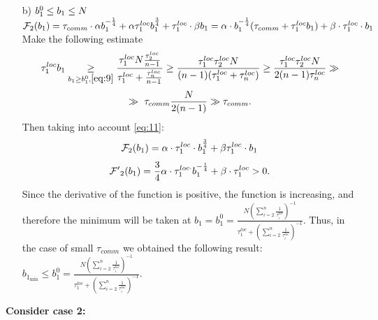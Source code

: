 \documentclass{article}
\begin{document}
\begin{itemize}
    \item[b)] $b_1^0\leq b_1\leq N\\$
    $\mathcal{F}_2(b_1) = \tau_{comm}\cdot 
    \alpha  b_1^{-\frac{1}{4}} + 
    \alpha\tau_1^{loc} b_1^{\frac{3}{4}}  + \tau_1^{loc}\cdot \beta b_1 =  \alpha\cdot b_1^{-\frac{1}{4}}(\tau_{comm} + \tau_1^{loc}b_1) + \beta\cdot\tau_1^{loc}\cdot b_1\\$
    Make the following estimate
    \begin{equation}
    \label{eq:11}
      \tau_1^{loc}b_1\underset{b_1\geq b_1^0, \eqref{eq:9}}{\geq} \frac{\tau_1^{loc}N\frac{\tau_2^{loc}}{n - 1}}{\tau_1^{loc} + \frac{\tau_n^{loc}}{n - 1}}\geq \frac{\tau_1^{loc}\tau_2^{loc}N}{(n - 1)(\tau_1^{loc} + \tau_n^{loc})}\geq \frac{\tau_1^{loc}\tau_2^{loc}N}{2(n - 1)\tau_n^{loc}} \gg
    \end{equation}
    \begin{equation}
         \notag
         \gg ~
       \tau_{comm}\frac{N}{2(n - 1)} \gg \tau_{comm}.
    \end{equation}
    Then taking into account \eqref{eq:11}:
    \begin{equation}
        \notag
        \mathcal F_2(b_1) = \alpha\cdot\tau_1^{loc}\cdot b_1^{\frac{3}{4}} + \beta \tau_1^{loc}\cdot b_1
    \end{equation}
    \begin{equation}
        \notag
        \mathcal{F'}_2(b_1) = \frac{3}{4}\alpha\cdot\tau_1^{loc\cdot} b_1^{-\frac{1}{4}} + \beta\cdot\tau_1^{loc} > 0.
    \end{equation}
    Since the derivative of the function is positive, the function is increasing, and therefore the minimum will be taken at $b_1 = b_1^{0} = \frac{N (\sum\limits_{i = 2}^{n} \frac{1}{\tau_i^{loc}})^{-1}}{\tau_1^{loc} + (\sum\limits_{i = 2}^{n} \frac{1}{\tau_i^{loc}})^{-1}}.$  
Thus, in the case of small $\tau_{comm}$ we obtained the following result:\\
$b_{1_{\min}} \leq b_1^0 = \frac{N (\sum\limits_{i = 2}^{n} \frac{1}{\tau_i^{loc}})^{-1}}{\tau_1^{loc} + (\sum\limits_{i = 2}^{n} \frac{1}{\tau_i^{loc}})^{-1}}$.
\end{itemize}
\textbf{Consider case 2:}
\end{document}
